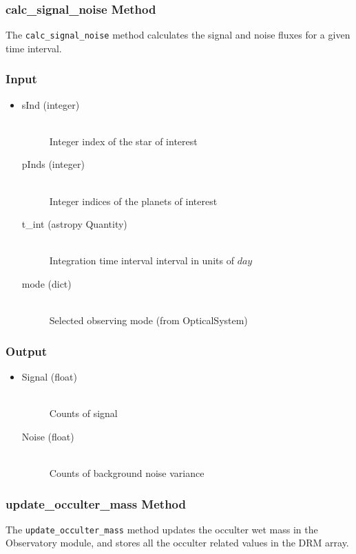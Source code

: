 \documentclass[cleanfoot]{asme2ej}
\begin{document}
\subsubsection{calc\_signal\_noise Method} \label{sec:calcsignalnoisetask}
The \verb+calc_signal_noise+ method calculates the signal and noise fluxes for a given time interval.
\subsubsection*{Input}
\begin{itemize}
\item
\begin{description}
    \item[sInd (integer)] \hfill \\ Integer index of the star of interest
    \item[pInds (integer)] \hfill \\ Integer indices of the planets of interest
    \item[t\_int (astropy Quantity)] \hfill \\ Integration time interval interval in units of $day$
    \item[mode (dict)] \hfill \\ Selected observing mode (from OpticalSystem)
\end{description}
\end{itemize}
\subsubsection*{Output}
\begin{itemize}
\item
\begin{description}
    \item[Signal (float)] \hfill \\ Counts of signal
    \item[Noise (float)] \hfill \\ Counts of background noise variance
\end{description}
\end{itemize}

\subsubsection{update\_occulter\_mass Method} \label{sec:updateoccultermasstask}
The \verb+update_occulter_mass+ method updates the occulter wet mass in the Observatory module, and stores all the occulter related values in the DRM array. 
\end{document}
